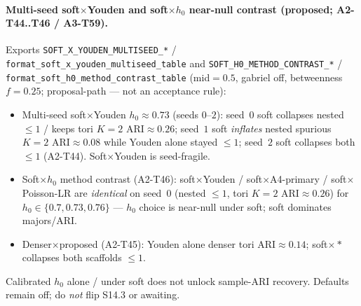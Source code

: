 \documentclass[11pt]{article}
\begin{document}
\paragraph{Multi-seed soft$\times$Youden and soft$\times h_0$ near-null contrast
(proposed; A2-T44..T46 / A3-T59).}
Exports \texttt{SOFT\_X\_YOUDEN\_MULTISEED\_*} /
\texttt{format\_soft\_x\_youden\_multiseed\_table} and
\texttt{SOFT\_H0\_METHOD\_CONTRAST\_*} /
\texttt{format\_soft\_h0\_method\_contrast\_table} (mid${=}0.5$, gabriel off,
betweenness $f{=}0.25$; proposal-path --- not an acceptance rule):
\begin{itemize}[leftmargin=1.5em]
  \item Multi-seed soft$\times$Youden $h_0\approx 0.73$ (seeds $0$--$2$):
  seed~$0$ soft collapses nested $\le 1$ / keeps tori $K{=}2$ ARI$\approx 0.26$;
  seed~$1$ soft \emph{inflates} nested spurious $K{=}2$ ARI$\approx 0.08$
  while Youden alone stayed $\le 1$; seed~$2$ soft collapses both $\le 1$
  (A2-T44). Soft$\times$Youden is seed-fragile.
  \item Soft$\times h_0$ method contrast (A2-T46): soft$\times$Youden /
  soft$\times$A4-primary / soft$\times$Poisson-LR are
  \emph{identical} on seed~$0$ (nested $\le 1$, tori $K{=}2$ ARI$\approx 0.26$)
  for $h_0\in\{0.7,0.73,0.76\}$ --- $h_0$ choice is near-null under soft;
  soft dominates majors/ARI.
  \item Denser$\times$proposed (A2-T45): Youden alone denser tori
  ARI$\approx 0.14$; soft$\times*$ collapses both scaffolds $\le 1$.
\end{itemize}
Calibrated $h_0$ alone / under soft does not unlock sample-ARI recovery.
Defaults remain off; do \emph{not} flip S14.3 or awaiting.
\end{document}
